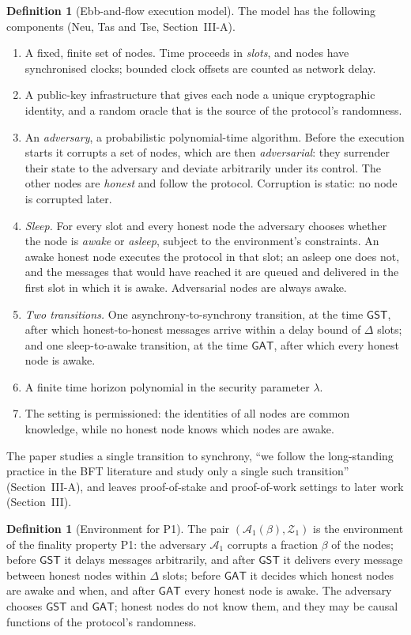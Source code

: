 \documentclass[11pt,a4paper]{article}
\theoremstyle{definition}
\newtheorem{definition}[theorem]{Definition}
\newcommand{\Adv}{\mathcal{A}}
\newcommand{\GST}{\mathsf{GST}}
\newcommand{\GAT}{\mathsf{GAT}}
\newcommand{\Env}{\mathcal{Z}}
\begin{document}
\begin{definition}[Ebb-and-flow execution model]\label{def:ntt-exec}
The model has the following components (Neu, Tas and Tse, Section~III-A).
\begin{enumerate}[label=(\roman*)]
\item A fixed, finite set of nodes. Time proceeds in \emph{slots}, and nodes
  have synchronised clocks; bounded clock offsets are counted as network
  delay.
\item A public-key infrastructure that gives each node a unique
  cryptographic identity, and a random oracle that is the source of the
  protocol's randomness.
\item An \emph{adversary}, a probabilistic polynomial-time algorithm. Before
  the execution starts it corrupts a set of nodes, which are then
  \emph{adversarial}: they surrender their state to the adversary and
  deviate arbitrarily under its control. The other nodes are \emph{honest}
  and follow the protocol. Corruption is static: no node is corrupted later.
\item \emph{Sleep.} For every slot and every honest node the adversary
  chooses whether the node is \emph{awake} or \emph{asleep}, subject to the
  environment's constraints. An awake honest node executes the protocol in
  that slot; an asleep one does not, and the messages that would have
  reached it are queued and delivered in the first slot in which it is awake.
  Adversarial nodes are always awake.
\item \emph{Two transitions.} One asynchrony-to-synchrony transition, at the
  time $\GST$, after which honest-to-honest messages arrive within a delay
  bound of $\Delta$ slots; and one sleep-to-awake transition, at the time
  $\GAT$, after which every honest node is awake.
\item A finite time horizon polynomial in the security parameter $\lambda$.
\item The setting is permissioned: the identities of all nodes are common
  knowledge, while no honest node knows which nodes are awake.
\end{enumerate}
\end{definition}

The paper studies a single transition to synchrony, ``we follow the
long-standing practice in the BFT literature and study only a single such
transition'' (Section~III-A), and leaves proof-of-stake and proof-of-work
settings to later work (Section~III).

\begin{definition}[Environment for P1]\label{def:ntt-env1}
The pair $(\Adv_1(\beta), \Env_1)$ is the environment of the finality
property P1: the adversary $\Adv_1$ corrupts a fraction $\beta$ of the nodes;
before $\GST$ it delays messages arbitrarily, and after $\GST$ it delivers
every message between honest nodes within $\Delta$ slots; before $\GAT$ it
decides which honest nodes are awake and when, and after $\GAT$ every honest
node is awake. The adversary chooses $\GST$ and $\GAT$; honest nodes do not
know them, and they may be causal functions of the protocol's randomness.
\end{definition}
\end{document}
